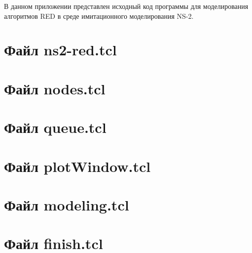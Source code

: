 
В данном приложении представлен исходный код программы для моделирования алгоритмов RED в среде имитационного моделирования NS-2.


\chapter{Файл ns2-red.tcl}
\label{app3:1}





\chapter{Файл nodes.tcl}
\label{app3:2}





\chapter{Файл queue.tcl}
\label{app3:3}





\chapter{Файл plotWindow.tcl}
\label{app3:4}





\chapter{Файл modeling.tcl}
\label{app3:5}





\chapter{Файл finish.tcl}
\label{app3:6}



